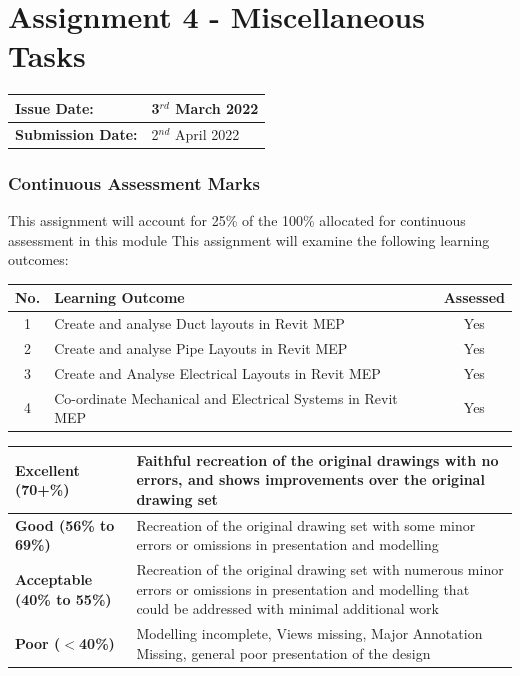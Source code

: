 
	
\part*{Assignment 4 - Miscellaneous Tasks}

\begin{tabularx}{\textwidth}{ |X|X| }
	\hline
	\textbf{Issue Date:} & 3$^{rd}$ March 2022\\
	\hline 
	\textbf{Submission Date:}  & 2$^{nd}$ April 2022\\
	\hline
\end{tabularx}

\section*{Continuous Assessment Marks}
This assignment will account for 25\% of the 100\% allocated for continuous assessment in this module
This assignment will examine the following learning outcomes:\\

\begin{tabularx}{\textwidth}{ |c|X|c| }
	\hline
	\textbf{No.} & \textbf{Learning Outcome} & \textbf{Assessed} \\
	\hline 
	1  & Create and analyse Duct layouts in Revit MEP & Yes \\
	2  & Create and analyse Pipe Layouts in Revit MEP & Yes \\
	3  & Create and Analyse Electrical Layouts in Revit MEP & Yes \\
	4  & Co-ordinate Mechanical and Electrical Systems in Revit MEP & Yes \\
	\hline
\end{tabularx}

\vspace{1cm}

\begin{tabularx}{\textwidth}{ |l|X| }
	\hline 
	\textbf{Excellent (70+\%)} & Faithful recreation of the original drawings with no errors, and shows improvements over the original drawing set\\ 
	\hline
	\textbf{Good (56\% to 69\%)} & Recreation of the original drawing set with some minor errors or omissions in presentation and modelling \\
	\hline
	\textbf{Acceptable (40\% to 55\%)} & Recreation of the original drawing set with numerous minor errors or omissions in presentation and modelling that could be addressed with minimal additional work \\ 
	\hline
	\textbf{Poor ($<$40\%)} & Modelling incomplete, Views missing, Major Annotation Missing, general poor presentation of the design  \\
	\hline
\end{tabularx}





